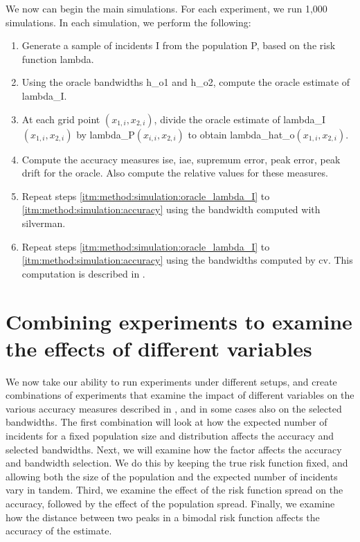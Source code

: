 We now can begin the main simulations.
For each experiment, we run 1,000 simulations.
In each simulation, we perform the following:
\begin{enumerate}
    \item\label{itm:method:simulation:generate} Generate a sample of incidents \gls{I} from the population \gls{P}, based on the risk function \gls{lambda}.
    \item\label{itm:method:simulation:oracle_lambda_I} Using the \gls{oracle} bandwidths \gls{h_o1} and \gls{h_o2}, compute the \gls{oracle} estimate of \gls{lambda_I}.
    \item\label{itm:method:simulation:oracle_lambda_hat} At each grid point $(x_{1,i}, x_{2,i})$, divide the oracle estimate of \gls{lambda_I}$(x_{1,i}, x_{2,i})$ by \gls{lambda_P}$(x_{i,i}, x_{2,i})$ to obtain \gls{lambda_hat_o}$(x_{1,i}, x_{2,i})$.
    \item\label{itm:method:simulation:accuracy} Compute the accuracy measures \gls{ise}, \gls{iae}, \gls{supremum error}, \gls{peak error}, \gls{peak drift} for the \gls{oracle}.
    Also compute the relative values for these measures.
    \item\label{itm:method:simulation:silverman_lambda_I} Repeat steps \ref{itm:method:simulation:oracle_lambda_I} to \ref{itm:method:simulation:accuracy} using the bandwidth computed with \gls{silverman}.
    \item\label{itm:method:simulation:cv_lambda_I} Repeat steps \ref{itm:method:simulation:oracle_lambda_I} to \ref{itm:method:simulation:accuracy} using the bandwidths computed by \gls{cv}.
    This computation is described in .
\end{enumerate}

\section[Combining experiments]{Combining experiments to examine the effects of different variables}
\label{sec:method:combining_experiments}

We now take our ability to run experiments under different setups,
and create combinations of experiments that examine the impact of different variables on the various accuracy measures described in ,
and in some cases also on the selected bandwidths.
The first combination will look at how the expected number of incidents for a fixed population size and distribution affects the accuracy and selected bandwidths.
Next, we will examine how the \gls{factor} affects the accuracy and bandwidth selection.
We do this by keeping the true risk function fixed, and allowing both the size of the population and the expected number of incidents vary in tandem.
Third, we examine the effect of the risk function spread on the accuracy,
followed by the effect of the population spread.
Finally,
we examine how the distance between two peaks in a bimodal risk function affects the accuracy of the estimate.

